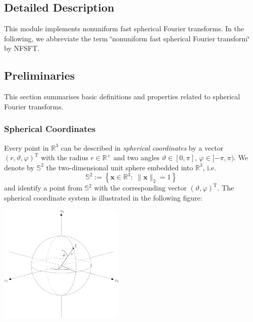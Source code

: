 \subsection{Detailed Description}
This module implements nonuniform fast spherical Fourier transforms. In the following, we abbreviate the term \char`\"{}nonuniform fast spherical Fourier
transform\char`\"{} by N\-F\-S\-F\-T.\hypertarget{group__nfsft_Preliminaries}{}\subsection{Preliminaries}\label{group__nfsft_Preliminaries}
This section summarises basic definitions and properties related to spherical Fourier transforms.\hypertarget{group__nfsft_sc}{}\subsubsection{Spherical Coordinates}\label{group__nfsft_sc}
Every point in $\mathbb{R}^3$ can be described in {\itshape spherical} {\itshape coordinates} by a vector $(r,\vartheta,\varphi)^{\mathrm{T}}$ with the radius $r \in \mathbb{R}^{+}$ and two angles $\vartheta \in [0,\pi]$, $\varphi \in [-\pi,\pi)$. We denote by $\mathbb{S}^2$ the two-\/dimensional unit sphere embedded into $\mathbb{R}^3$, i.\-e. \[ \mathbb{S}^2 := \left\{\mathbf{x} \in \mathbb{R}^{3}:\; \|\mathbf{x}\|_2=1\right\} \] and identify a point from $\mathbb{S}^2$ with the corresponding vector $(\vartheta,\varphi)^{\mathrm{T}}$. The spherical coordinate system is illustrated in the following figure\-:

\begin{center} 
\begin{DoxyImageNoCaption}
  \mbox{\includegraphics[width=0.45\textwidth]{sphere}}
\end{DoxyImageNoCaption}
 \end{center} 

